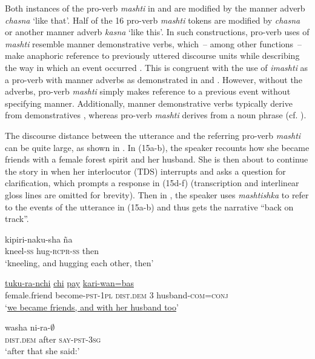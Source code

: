 \documentclass[output=paper]{langscibook}
\begin{document}
Both instances of the pro-verb \textit{mashti} in  and  are modified by the manner adverb \textit{chasna} ‘like that’. Half of the 16 pro-verb \textit{mashti} tokens are modified by \textit{chasna} or another manner adverb \textit{kasna} ‘like this’. In such constructions, pro-verb uses of \textit{mashti} resemble manner demonstrative verbs, which~-- among other functions~-- make anaphoric reference to previously uttered discourse units while describing the way in which an event occurred \citep{Guérin2015}. This is congruent with the use of \textit{imashti} as a pro-verb with manner adverbs as demonstrated in  and . However, without the adverbs, pro-verb \textit{mashti} simply makes reference to a previous event without specifying manner. Additionally, manner demonstrative verbs typically derive from demonstratives \citep[146]{Guérin2015}, whereas pro-verb \textit{mashti} derives from a noun phrase (cf. ).

The discourse distance between the utterance and the referring pro-verb \textit{mashti} can be quite large, as shown in . In (15a-b), the speaker recounts how she became friends with a female forest spirit and her husband. She is then about to continue the story in  when her interlocutor (TDS) interrupts and asks a question for clarification, which prompts a response in (15d-f) (transcription and interlinear gloss lines are omitted for brevity). Then in , the speaker uses \textit{mashtishka} to refer to the events of the utterance in (15a-b) and thus gets the narrative “back on track”.

\ea%
\label{ex:rice:15}
\ea \label{ex:rice:15a}
 {kipiri-naku-sha}  {ña}\\
{kneel-\textsc{ss}} {hug-\textsc{rcpr-ss}} {then}\\
\glt    ‘kneeling, and hugging each other, then’
\medskip
    
\ex \label{ex:rice:15b}
 {\uline{tuku-ra-nchi}} {\uline{chi}} {\uline{pay}} {\uline{kari-wan=bas}}\\
{female.friend} {become-\textsc{pst-1pl}} {\textsc{dist.dem}}  {3}  {husband\textsc{{}-com=conj}}\\
\glt  ‘\uline{we became friends, and with her husband too}’
\medskip

\ex \label{ex:rice:15c}
 {washa} {ni-ra-${\emptyset}$}\\
{\textsc{dist.dem}} {after} {\textsc{say-pst-3sg}}\\
\glt  ‘after that she said:’
\medskip
\end{document}
